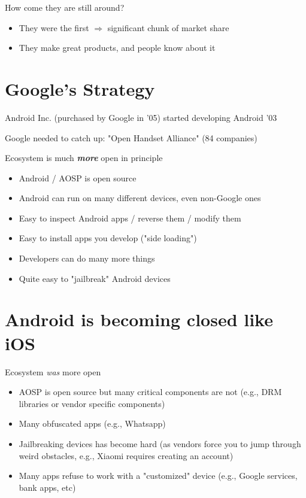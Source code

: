 \documentclass[11pt]{article}
\begin{document}
How come they are still around?
\begin{itemize}
	\item They were the first $\Rightarrow$ significant chunk of market share
	\item They make great products, and people know about it
\end{itemize}

\section*{Google's Strategy}

Android Inc. (purchased by Google in '05) started developing Android '03

Google needed to catch up: "Open Handset Alliance" (84 companies)

Ecosystem is much \textit{\textbf{more}} open in principle
\begin{itemize}
	\item Android / AOSP is open source
	\item Android can run on many different devices, even non-Google ones
	\item Easy to inspect Android apps / reverse them / modify them
	\item Easy to install apps you develop ("side loading")
	\item Developers can do many more things
	\item Quite easy to "jailbreak" Android devices
\end{itemize}

\section*{Android is becoming closed like iOS}

Ecosystem \textit{was} more open
\begin{itemize}
	\item AOSP is open source but many critical components are not (e.g., DRM libraries or vendor specific components)
	\item Many obfuscated apps (e.g., Whatsapp)
	\item Jailbreaking devices has become hard (as vendors force you to jump through weird obstacles, e.g., Xiaomi requires creating an account)
	\item Many apps refuse to work with a "customized" device (e.g., Google services, bank apps, etc) 
\end{itemize}
\end{document}
